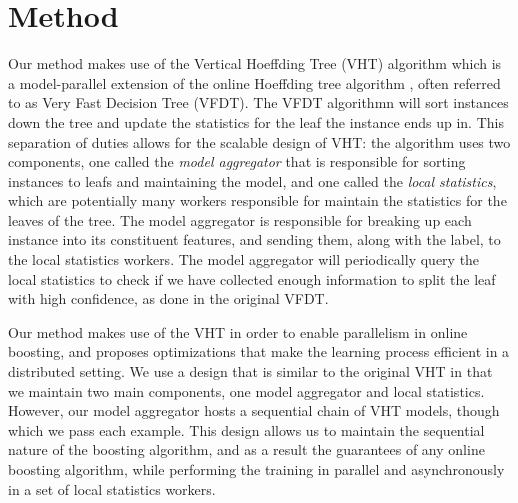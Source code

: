 \section{Method}
\label{sec:boostvht-method}

Our method makes use of the Vertical Hoeffding Tree (VHT) algorithm \cite{kourtellis2016vht} which is a model-parallel
extension of the online Hoeffding tree algorithm \cite{vfdt}, often referred to as
Very Fast Decision Tree (VFDT).
The VFDT algorithmn will sort instances down the tree and update the statistics for the
leaf the instance ends up in. This separation of duties allows for the scalable design of
VHT: the algorithm uses two components, one called the \emph{model aggregator}
that is responsible for sorting instances to leafs and maintaining the model, and
one called the \emph{local statistics}, which are potentially many workers responsible
for maintain the statistics for the leaves of the tree.
The model aggregator is responsible for breaking up each instance into its constituent
features, and sending them, along with the label, to the local statistics workers.
The model aggregator will periodically query the local statistics to check if we have
collected enough information to split the leaf with high confidence, as done in the
original VFDT.

Our method makes use of the VHT in order to enable parallelism in online boosting,
and proposes optimizations that make the learning process efficient in a distributed
setting. We use a design that is similar to the original VHT in that we maintain
two main components, one model aggregator and local statistics. However, our model
aggregator hosts a sequential chain of VHT models, though which we pass each example.
This design allows us to maintain the sequential nature of the boosting algorithm,
and as a result the guarantees of any online boosting algorithm, while performing
the training in parallel and asynchronously in a set of local statistics workers.

